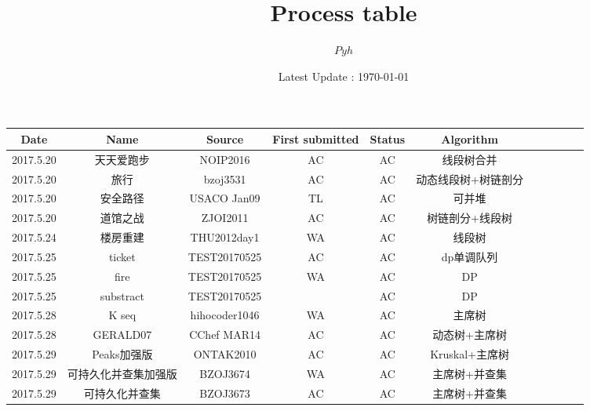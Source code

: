 \documentclass{article}
\date{Latest Update : \today}
\title{Process table}
\author{$Pyh$}
\begin{document}
\maketitle

\begin{longtable}{ccccccccccc}
  \hline
  Date & Name & Source & First submitted & Status & Algorithm\\
  \hline
  2017.5.20 & 天天爱跑步 & NOIP2016 & AC & AC & 线段树合并\\
  \hline
  2017.5.20 & 旅行 & bzoj3531 & AC & AC & 动态线段树+树链剖分\\
  \hline
  2017.5.20 & 安全路径 & USACO Jan09 & TL & AC & 可并堆\\
  \hline
  2017.5.20 & 道馆之战 & ZJOI2011 & AC & AC & 树链剖分+线段树\\
  \hline
  2017.5.24 & 楼房重建 & THU2012day1 & WA & AC & 线段树\\
  \hline
  2017.5.25 & ticket & TEST20170525 & AC & AC & dp单调队列\\
  \hline
  2017.5.25 & fire & TEST20170525 & WA & AC & DP\\
  \hline
  2017.5.25 & substract & TEST20170525 & & AC & DP\\
  \hline
  2017.5.28 & K seq & hihocoder1046 & WA & AC & 主席树\\
  \hline
  2017.5.28 & GERALD07 & CChef MAR14 & AC & AC & 动态树+主席树\\
  \hline
  2017.5.29 & Peaks加强版 & ONTAK2010 & AC & AC & Kruskal+主席树\\
  \hline
  2017.5.29 & 可持久化并查集加强版 & BZOJ3674 & WA & AC & 主席树+并查集\\
  \hline
  2017.5.29 & 可持久化并查集 & BZOJ3673 & AC & AC & 主席树+并查集\\
  \hline
\end{longtable}
\end{document}
